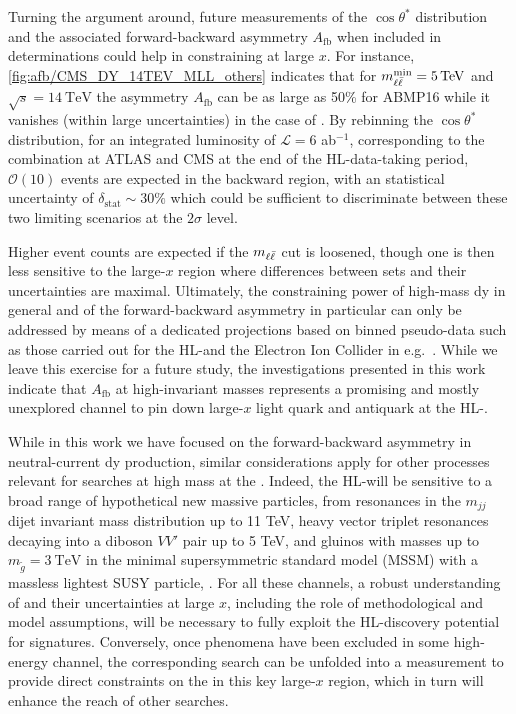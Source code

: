 Turning the argument around, future measurements of the $\cos\theta^*$
distribution and the associated forward-backward asymmetry 
$A_{\text{fb}}$ when included in \pdf determinations could help in
constraining \pdfs at large $x$.
%
For instance, \cref{fig:afb/CMS_DY_14TEV_MLL_others} indicates that for
$\mll^{\text{min}}=\SI{5}{\tera\electronvolt}$ and $\sqrt{s}=\SI{14}{\tera\electronvolt}$ the
asymmetry $A_{\text{fb}}$ can be as large as 50\% for ABMP16
while it vanishes (within large uncertainties) in the case of .
%
By rebinning the $\cos\theta^*$ distribution, for an integrated
luminosity of $\mathcal{L}=6$ ab$^{-1}$, corresponding to the
combination at ATLAS and CMS 
at the end of the HL-\lhc data-taking period, $\mathcal{O}(10)$ events are expected in the backward region,
with an statistical uncertainty of $\delta_{\text{stat}}\sim 30\%$ which could be sufficient to
discriminate between these two limiting scenarios at the $2\sigma$ level.

Higher event counts are expected if the $m_{\ell\bar{\ell}}$ cut is loosened, though one is
then less sensitive to the large-$x$ region where differences between \pdf sets and their
uncertainties are maximal.
%
Ultimately, the constraining power of high-mass \acrlong{dy} in general and of
the forward-backward asymmetry in particular can only be addressed by means of
a dedicated projections based on binned pseudo-data such as those carried out
for the HL-\lhc and the Electron Ion Collider in e.g.\
\cite{AbdulKhalek:2018rok,Khalek:2021ulf}.
%
While we leave this exercise for a future study, the investigations
presented in this work indicate that $A_{\text{fb}}$
at high-invariant masses represents a promising and mostly
unexplored channel to pin down large-$x$ light
quark and antiquark \pdfs at the HL-\lhc.

While in this work
we have focused on the forward-backward asymmetry in neutral-current \acrlong{dy} production,
similar considerations apply for other processes relevant
for \bsm searches at high mass at the \lhc.
%
Indeed, the HL-\lhc will be sensitive to a broad range of hypothetical
new massive particles, from resonances in the $m_{jj}$ dijet invariant mass distribution up to 11 TeV,
heavy vector triplet resonances decaying into a diboson $VV'$ pair up to 5 TeV,
and gluinos with masses up to $m_{\tilde{g}}=\SI{3}{\tera\electronvolt}$ in the minimal
supersymmetric standard model (MSSM) with a massless lightest SUSY
particle, \cite{CidVidal:2018eel}.
%
For all these channels, a robust understanding of \pdfs
and their uncertainties at large $x$, including the role of
methodological and model assumptions, will be necessary to fully exploit
the HL-\lhc discovery potential for \bsm signatures.
%
%
Conversely, once \bsm phenomena have been excluded in some high-energy channel,
the corresponding search can be unfolded into a measurement to provide direct
constraints on the \pdfs in this key large-$x$ region, which in turn will
enhance the reach of other searches.
